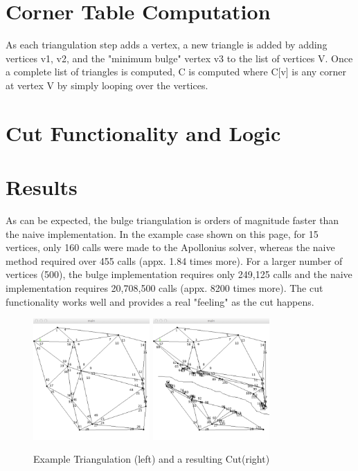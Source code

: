 \documentclass[letterpaper,10pt]{IEEEtran}
\begin{document}
\section{Corner Table Computation}
As each triangulation step adds a vertex, a new triangle is added by adding vertices v1, v2, and the "minimum bulge" vertex v3 to the list of vertices V.  Once a complete list of triangles is computed, C is computed where C[v] is any corner at vertex V by simply looping over the vertices.
\section{Cut Functionality and Logic}

\section{Results}
As can be expected, the bulge triangulation is orders of magnitude faster than the naive implementation.  In the example case shown on this page, for 15 vertices, only 160 calls were made to the Apollonius solver, whereas the naive method required over 455 calls (appx. 1.84 times more).  For a larger number of vertices (500), the bulge implementation requires only 249,125 calls and the naive implementation requires 20,708,500 calls (appx. 8200 times more).  
The cut functionality works well and provides a real "feeling" as the cut happens. 
\begin{figure}[!t]
\centering
\includegraphics[width=1.75in]{main/data/triangulation}
\includegraphics[width=1.75in]{main/data/cut}
\caption{Example Triangulation (left) and a resulting Cut(right)}
\label{fig_triangulation}
\end{figure}
\end{document}
